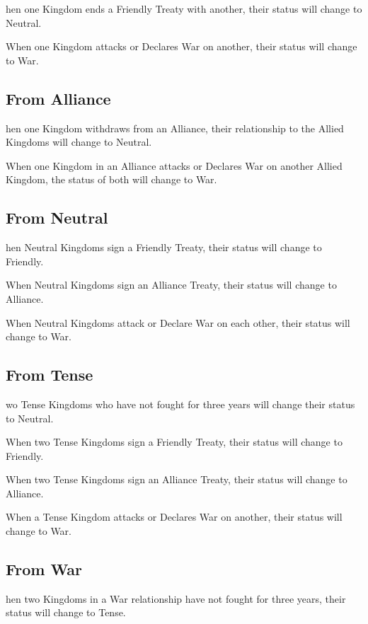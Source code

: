 hen one Kingdom ends a Friendly Treaty with another, their status will change to Neutral.

When one Kingdom attacks or Declares War on another, their status will change to War.

\subsection{\textsf{From Alliance}}

hen one Kingdom withdraws from an Alliance, their relationship to the Allied Kingdoms will change to Neutral.

When one Kingdom in an Alliance attacks or Declares War on another Allied Kingdom, the status of both will change to War.

\subsection{\textsf{From Neutral}}

hen Neutral Kingdoms sign a Friendly Treaty, their status will change to Friendly.

When Neutral Kingdoms sign an Alliance Treaty, their status will change to Alliance.

When Neutral Kingdoms attack or Declare War on each other, their status will change to War.

\subsection{\textsf{From Tense}}

wo Tense Kingdoms who have not fought for three years will change their status to Neutral.

When two Tense Kingdoms sign a Friendly Treaty, their status will change to Friendly.

When two Tense Kingdoms sign an Alliance Treaty, their status will change to Alliance.

When a Tense Kingdom attacks or Declares War on another, their status will change to War.

\subsection{\textsf{From War}}


hen two Kingdoms in a War relationship have not fought for three years, their status will change to Tense.

